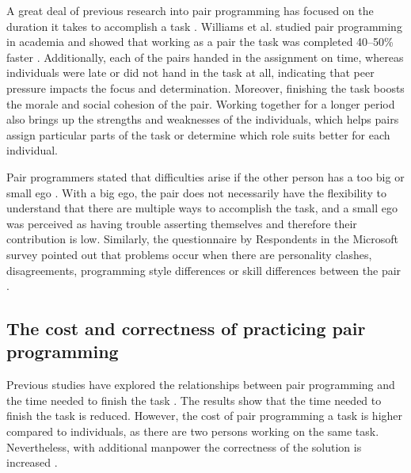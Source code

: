 \documentclass[conference]{IEEEtran}
\begin{document}
A great deal of previous research into pair programming has focused on the duration it takes to accomplish a task \cite{10.1145/2652524.2652529, Williams2000Strengthening, Hannay2009effectiveness}. Williams et al. studied pair programming in academia and showed that working as a pair the task was completed 40--50\% faster \cite{Williams2000Strengthening}. Additionally, each of the pairs handed in the assignment on time, whereas individuals were late or did not hand in the task at all, indicating that peer pressure impacts the focus and determination. Moreover, finishing the task boosts the morale and social cohesion of the pair. Working together for a longer period also brings up the strengths and weaknesses of the individuals, which helps pairs assign particular parts of the task or determine which role suits better for each individual.

Pair programmers stated that difficulties arise if the other person has a too big or small ego \cite{Williams2000Strengthening}. With a big ego, the pair does not necessarily have the flexibility to understand that there are multiple ways to accomplish the task, and a small ego was perceived as having trouble asserting themselves and therefore their contribution is low. Similarly, the questionnaire by Respondents in the Microsoft survey pointed out that problems occur when there are personality clashes, disagreements, programming style differences or skill differences between the pair \cite{10.1145/1414004.1414026}.



\subsection{The cost and correctness of practicing pair programming}

Previous studies have explored the relationships between pair programming and the time needed to finish the task \cite{ 10.1145/1414004.1414026, 10.5555/377517.377531, Arisholm2007Evaluating}. The results show that the time needed to finish the task is reduced. However, the cost of pair programming a task is higher compared to individuals, as there are two persons working on the same task. Nevertheless, with additional manpower the correctness of the solution is increased \cite{Arisholm2007Evaluating, Williams2000Strengthening}. 
\end{document}
